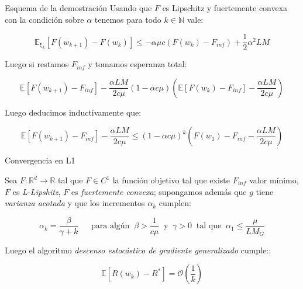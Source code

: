 \documentclass{beamer}
\newcommand{\R}{{\mathbb{R}}}
\newcommand{\N}{{\mathbb{N}}}
\newcommand{\expectation}[1]{\mathbb{E} \left[#1\right]}
\newcommand{\expectationsub}[2]{\mathbb{E}_{#1} \left[#2\right]}
\newcommand{\expectationchik}[1]{\expectationsub{\upxi_{k}}{#1}}
\begin{document}
\begin{frame}{Esquema de la demostraci\'on}
	Usando que $F$ es Lipschitz y fuertemente convexa con la condici\'on sobre $\alpha$ tenemos para todo $k \in \N$ vale:

\begin{equation*}
\expectationchik{F(w_{k+1}) - F(w_k)} \leq - \alpha \mu c \left(F(w_k) - F_{inf} \right)+ \frac{1}{2} \alpha ^2 LM 
\end{equation*}

Luego si restamos $F_{inf}$ y tomamos esperanza total:

\begin{equation*}
\expectation{F(w_{k+1}) - F_{inf}} - \dfrac{\alpha L M}{2 c \mu }   \left(1 - \alpha c \mu  \right)  \left(\expectation{F(w_k) - F_{inf}}  -  \dfrac{\alpha L M}{2 c \mu }  \right)
\end{equation*}

Luego deducimos inductivamente que:

\begin{equation*}
\expectation{F(w_{k+1}) - F_{inf}} - \dfrac{\alpha L M}{2 c \mu } \leq \left(1 - \alpha c \mu \right)^{k} \left(F(w_1) - F_{inf} - \dfrac{\alpha LM}{2 c \mu} \right)
\end{equation*}
\end{frame}

\begin{frame}{Convergencia en L1}

\begin{theorem}
	Sea $F: \R^d \rightarrow \R$ tal que $F \in C^1$ la funci\'on objetivo tal que existe $F_{inf}$ valor m\'inimo, $F$ es \textit{L-Lipshitz}, $F$ es \textit{fuertemente convexa}; supongamos adem\'as que $g$ tiene \textit{varianza acotada} y que los incrementos $\alpha_k$ cumplen:
	
	\begin{equation*}
	\alpha_k =  \dfrac{\beta}{\gamma + k} \quad \ \text{ para alg\'un } \ \beta > \frac{1}{c \mu} \  \text{ y } \ \gamma > 0 \  \text{ tal que } \ \alpha_1 \leq \dfrac{\mu}{L M_G} 
	\end{equation*}
	
	Luego el algoritmo \textit{descenso estoc\'astico de gradiente generalizado} cumple::
	
	\begin{equation*}
	\expectation{R(w_k) - R^*} = \mathcal{O} \left(\frac{1}{k}\right)
	\end{equation*}
	
\end{theorem}
\end{frame}
\end{document}

